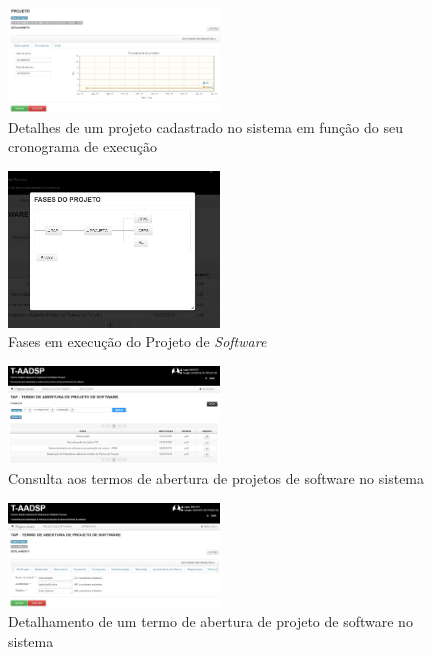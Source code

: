 \documentclass{acm_proc_article-sp}
\begin{document}
\begin{appendices}
\begin{figure}[h]
\centering %
\includegraphics[width=0.5\textwidth]{RF_detalhamento_Projeto_Cronograma.jpg} %
\caption{Detalhes de um projeto cadastrado no sistema em função do seu cronograma de execução}
\end{figure}

\begin{figure}[h]
\centering %
\includegraphics[width=0.5\textwidth]{RF_fases_do_projeto.jpg} %
\caption{Fases em execução do Projeto de \textit{Software}}
\end{figure}

\begin{figure}[h]
\centering %
\includegraphics[width=0.5\textwidth]{RF_TAPConsulta.jpg} %
\caption{Consulta aos termos de abertura de projetos de software no sistema}
\end{figure}

\begin{figure}[h]
\centering %
\includegraphics[width=0.5\textwidth]{RF_TAPDetalhamento.jpg} %
\caption{Detalhamento de um termo de abertura de projeto de software no sistema}
\end{figure}


\end{appendices}
\end{document}
